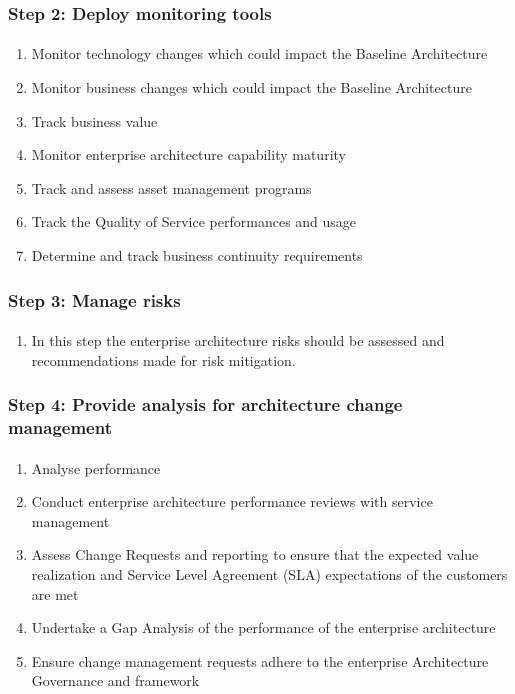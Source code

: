 \documentclass[aspectratio=169, table]{beamer}
\begin{document}
	\begin{frame}
		\frametitle{Step 2: Deploy monitoring tools}
		\framesubtitle{\hspace{1cm}}
		\vspace{20pt}
		\begin{enumerate}
			\item Monitor technology changes which could impact the Baseline Architecture
			\item Monitor business changes which could impact the Baseline Architecture
			\item Track business value
			\item Monitor enterprise architecture capability maturity
			\item Track and assess asset management programs
			\item Track the Quality of Service performances and usage
			\item Determine and track business continuity requirements
		\end{enumerate}
		
	\end{frame}
	
	\begin{frame}
		\frametitle{Step 3: Manage risks}
		\framesubtitle{\hspace{1cm}}
		\vspace{20pt}
		\begin{enumerate}
			\item In this step the enterprise architecture risks should be assessed and
			recommendations made for risk mitigation.
		\end{enumerate}
	\end{frame}
	
	\begin{frame}
		\frametitle{Step 4: Provide analysis for architecture change management}
		\framesubtitle{\hspace{1cm}}
		\vspace{20pt}
		\begin{enumerate}
			\item Analyse performance
			\item Conduct enterprise architecture performance reviews with service management
			\item Assess Change Requests and reporting to ensure that the expected value realization and Service Level Agreement (SLA) expectations of the customers are met
			\item Undertake a Gap Analysis of the performance of the enterprise architecture
			\item Ensure change management requests adhere to the enterprise Architecture Governance and framework
		\end{enumerate}
		
	\end{frame}
	
\end{document}
